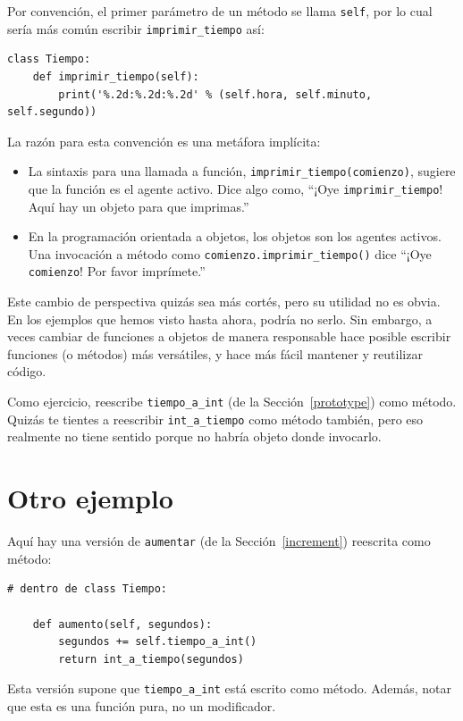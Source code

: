 \documentclass[10pt]{book}
\begin{document}
Por convención, el primer parámetro de un método se
llama {\tt self}, por lo cual sería más común escribir
\verb"imprimir_tiempo" así:

\begin{verbatim}
class Tiempo:
    def imprimir_tiempo(self):
        print('%.2d:%.2d:%.2d' % (self.hora, self.minuto, self.segundo))
\end{verbatim}
%
La razón para esta convención es una metáfora implícita:

\begin{itemize}

\item La sintaxis para una llamada a función, \verb"imprimir_tiempo(comienzo)",
  sugiere que la función es el agente activo.  Dice algo
  como, ``¡Oye \verb"imprimir_tiempo"!  Aquí hay un objeto para que imprimas.''

\item En la programación orientada a objetos, los objetos son los agentes
  activos.  Una invocación a método como \verb"comienzo.imprimir_tiempo()" dice
  ``¡Oye {\tt comienzo}!  Por favor imprímete.''

\end{itemize}

Este cambio de perspectiva quizás sea más cortés, pero su utilidad
no es obvia.  En los ejemplos que hemos visto hasta ahora, podría no
serlo.  Sin embargo, a veces cambiar de funciones a objetos de manera
responsable hace posible escribir funciones (o métodos) más versátiles,
y hace más fácil mantener y reutilizar código.

Como ejercicio, reescribe \verb"tiempo_a_int" (de la
Sección~\ref{prototype}) como método.  Quizás te tientes a
reescribir \verb"int_a_tiempo" como método también, pero eso realmente
no tiene sentido porque no habría objeto donde
invocarlo.


\section{Otro ejemplo}

Aquí hay una versión de {\tt aumentar} (de la Sección~\ref{increment})
reescrita como método:

\begin{verbatim}
# dentro de class Tiempo:

    def aumento(self, segundos):
        segundos += self.tiempo_a_int()
        return int_a_tiempo(segundos)
\end{verbatim}
%
Esta versión supone que \verb"tiempo_a_int" está escrito
como método.  Además, notar que
esta es una función pura, no un modificador.
\end{document}
